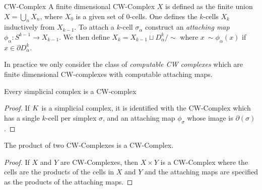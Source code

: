 \begin{definition}{CW-Complex}
 A finite dimensional CW-Complex $X$ is defined as the finite union $X = \bigcup_n X_n$, where $X_0$ is a given set of $0$-cells. One defines the $k$-cells $X_k$ inductively from $X_{k-1}$. To attach a $k$-cell $\sigma_\alpha$ construct an \emph{attaching map} $\phi_\alpha: S^{k-1} \rightarrow X_{k-1}$. We then define $X_k = X_{k-1} \sqcup D^k_\alpha / \sim$ where $x ~\sim \phi_\alpha(x)$ if $x \in \partial D^k_\alpha$. 
\end{definition}
In practice we only consider the class of  \emph{computable CW complexes} which are finite dimensional CW-complexes with computable attaching maps.
\begin{lemma}
Every simplicial complex is a CW-complex
\label{lem:simp-is-cw}
\end{lemma}
\begin{proof}
If $K$ is a simplicial complex, it is identified with the CW-Complex which has a single $k$-cell per simplex $\sigma$, and an attaching map $\phi_\sigma$ whose image is $\partial(\sigma)$.  
\end{proof}
\begin{lemma}
The product of two CW-Complexes is a CW-Complex.
\label{lem:cw-complex-product}
\end{lemma}
\begin{proof}
If $X$ and $Y$ are CW-Complexes, then $X \times Y$ is a CW-Complex where the cells are the products of the cells in $X$ and $Y$ and the attaching maps are specified as the products of the attaching maps.
\end{proof}

